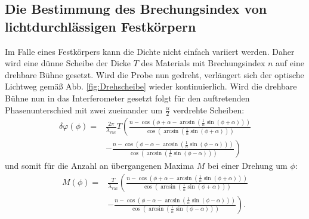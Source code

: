 \subsection{Die Bestimmung des Brechungsindex von lichtdurchlässigen Festkörpern}
Im Falle eines Festkörpers kann die Dichte nicht einfach variiert werden. Daher wird eine dünne Scheibe der Dicke $T$ des Materials mit Brechungsindex $n$ auf eine drehbare Bühne gesetzt. Wird die Probe nun gedreht, verlängert sich der optische Lichtweg gemäß Abb. \ref{fig:Drehscheibe} wieder kontinuierlich. Wird die drehbare Bühne nun in das Interferometer gesetzt folgt für den auftretenden Phasenunterschied mit zwei zueinander um $\frac{\alpha}{2}$ verdrehte Scheiben:
\begin{equation}
\begin{split}
\delta\varphi(\phi) = & \frac{2 \pi}{\lambda_\text{vac}} T \left( \frac{n - \cos\left(\phi+\alpha - \arcsin\left(\frac{1}{n} \sin(\phi+\alpha)\right)\right)}{\cos\left(\arcsin\left(\frac{1}{n} \sin(\phi+\alpha)\right)\right)} \right. \\
& \left. - \frac{n - \cos\left(\phi-\alpha - \arcsin\left(\frac{1}{n} \sin(\phi-\alpha)\right)\right)}{\cos\left(\arcsin\left(\frac{1}{n} \sin(\phi-\alpha)\right)\right)} \right)  \label{eq:phi}
\end{split}
\end{equation}
und somit für die Anzahl an übergangenen Maxima $M$ bei einer Drehung um $\phi$:
\begin{equation}
\begin{split}
M(\phi) = & \frac{T}{\lambda_\text{vac}} \left( \frac{n - \cos\left(\phi+\alpha - \arcsin\left(\frac{1}{n} \sin(\phi+\alpha)\right)\right)}{\cos\left(\arcsin\left(\frac{1}{n} \sin(\phi+\alpha)\right)\right)} \right. \\
& \left. - \frac{n - \cos\left(\phi-\alpha - \arcsin\left(\frac{1}{n} \sin(\phi-\alpha)\right)\right)}{\cos\left(\arcsin\left(\frac{1}{n} \sin(\phi-\alpha)\right)\right)} \right) \text{.} \label{eq:Mglas}
\end{split} 
\end{equation}





